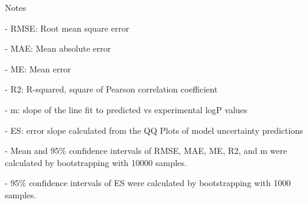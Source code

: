 \documentclass{article}
\begin{document}
Notes

- RMSE: Root mean square error

- MAE: Mean absolute error

- ME: Mean error

- R2: R-squared, square of Pearson correlation coefficient

- m: slope of the line fit to predicted vs experimental logP values

- ES: error slope calculated from the QQ Plots of model uncertainty predictions

- Mean and 95\% confidence intervals of RMSE, MAE, ME, R2, and m were calculated by bootstrapping with 10000 samples.

- 95\% confidence intervals of ES were calculated by bootstrapping with 1000 samples.\end{document}
\end{document}
